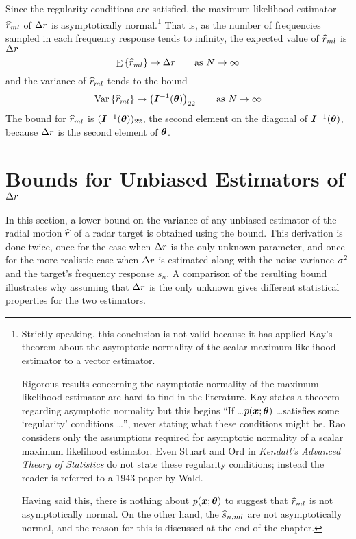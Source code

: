 Since the regularity conditions are satisfied, the maximum likelihood
estimator $\widehat{r}_{ml}$ of ${\Delta r}$ is asymptotically normal.\footnote{Strictly
speaking, this conclusion is not valid because it has applied Kay's theorem
about the asymptotic normality of the scalar maximum likelihood estimator
to a vector estimator.  

Rigorous results concerning the asymptotic normality of the maximum
likelihood estimator are hard to find in the literature.  Kay states a
theorem regarding asymptotic normality \cite[thm 7.3]{Kay93} but this
begins ``If \ldots $p(\bm{x};\bm{\theta})$ \ldots satisfies some `regularity'
conditions \ldots'', never stating what these conditions might be.  Rao
\cite[section 5f]{Rao65} considers only the assumptions required for
asymptotic normality of a scalar maximum likelihood estimator.  Even Stuart
and Ord in {\em Kendall's Advanced Theory of Statistics\/}
\protect\cite{Stu91} do not state these regularity conditions; instead the
reader is referred to a 1943 paper by Wald.

Having said this, there is nothing about $p(\bm{x};\bm{\theta})$ to suggest that
$\widehat{r}_{ml}$ is not asymptotically normal.  On the other hand, the $\widehat{s}_{n,ml}$ are
not asymptotically normal, and the reason for this is discussed at the end
of the chapter.}  That is, as the number of frequencies sampled in each
frequency response tends to infinity, the expected value of $\widehat{r}_{ml}$ is ${\Delta r}$
\begin{equation}
{\mathop{\rm E}\nolimits\left\{\widehat{r}_{ml}\right\}}\to{\Delta r}\qquad\hbox{as $N\to\infty$}
\end{equation}
and the variance of $\widehat{r}_{ml}$ tends to the \CR bound
\begin{equation}
{\mathop{\rm Var}\nolimits\left\{\widehat{r}_{ml}\right\}}\to\left(\bm{I}^{-1}(\bm{\theta})\right)_{22}\qquad\hbox{as $N\to\infty$}
\end{equation}
The \CR bound for $\widehat{r}_{ml}$ is $(\bm{I}^{-1}(\bm{\theta}))_{22}$, the second element 
on the diagonal of $\bm{I}^{-1}(\bm{\theta})$, because ${\Delta r}$ is the second element 
of $\bm{\theta}$.

\section{\CR Bounds for Unbiased Estimators of ${\Delta r}$}

In this section, a lower bound on the variance of any unbiased estimator of
the radial motion $\widehat{r}$ of a radar target is obtained using the \CR bound. 
This derivation is done twice, once for the case when ${\Delta r}$ is the only
unknown parameter, and once for the more realistic case when ${\Delta r}$ is
estimated along with the noise variance ${\sigma^2}$ and the target's
frequency response $s_n$.  A comparison of the resulting \CR bound illustrates
why assuming that ${\Delta r}$ is the only unknown gives different statistical
properties for the two estimators.


